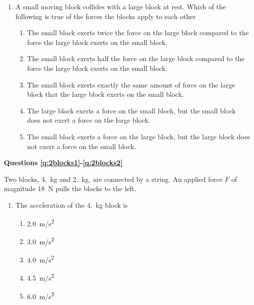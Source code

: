 \documentclass{../../oss-apphys}
\begin{document}
\genheader


\genmultidirections

\gengravity

\raggedcolumns
\begin{multicols}{2}
  \begin{enumerate}[leftmargin=18pt]
  \item A small moving block collides with a large block at rest. Which of the
    following is true of the forces the blocks apply to each other
    \begin{enumerate}[noitemsep,topsep=0pt,leftmargin=18pt,label=(\Alph*)]
    \item The small block exerts twice the force on the large block
      compared to the force the large block exerts on the small block.
    \item The small block exerts half the force on the large block compared
      to the force the large block exerts on the small block.
    \item The small block exerts exactly the same amount of force on the
      large block that the large block exerts on the small block.
    \item The large block exerts a force on the small block, but the small
      block does not exert a force on the large block.
    \item The small block exerts a force on the large block, but the large
      block does not exert a force on the small block.
    \end{enumerate}
    
  \end{enumerate}
  
  \textbf{Questions \ref{q:2blocks1}-\ref{q:2blocks2}}

  Two blocks, \SI{4.}{\kilo\gram} and \SI{2.}{\kilo\gram}, are connected by a
  string. An applied force $F$ of magnitude \SI{18}{\newton} pulls the blocks
  to the left.
  \begin{center}
  \end{center}
  
  \begin{enumerate}[resume,leftmargin=18pt]
    
  \item The acceleration of the \SI{4.}{\kilo\gram} block is
    \begin{enumerate}[noitemsep,topsep=0pt,leftmargin=18pt,label=(\Alph*)]
    \item\SI{2.0}{m/s^2}
    \item\SI{3.0}{m/s^2}
    \item\SI{4.0}{m/s^2}
    \item\SI{4.5}{m/s^2}
    \item\SI{6.0}{m/s^2}
    \end{enumerate}
    \label{q:2blocks1}
    

\end{enumerate}
\end{multicols}
\end{document}
